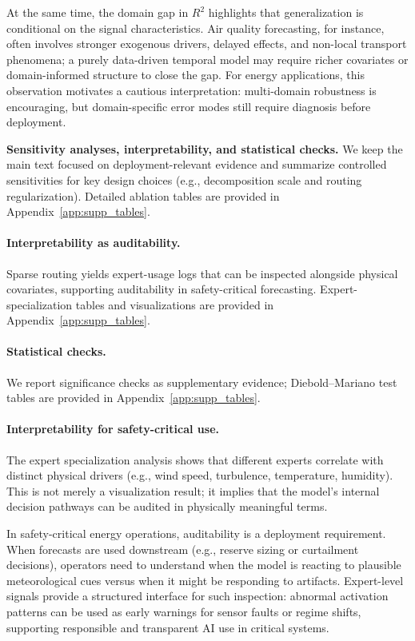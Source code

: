 \documentclass[review,3p,times]{elsarticle}
\begin{document}
At the same time, the domain gap in $R^2$ highlights that generalization is conditional on the signal characteristics. Air quality forecasting, for instance, often involves stronger exogenous drivers, delayed effects, and non-local transport phenomena; a purely data-driven temporal model may require richer covariates or domain-informed structure to close the gap. For energy applications, this observation motivates a cautious interpretation: multi-domain robustness is encouraging, but domain-specific error modes still require diagnosis before deployment.


\noindent\textbf{Sensitivity analyses, interpretability, and statistical checks.}\label{subsec:results_ablation_summary}
We keep the main text focused on deployment-relevant evidence and summarize controlled sensitivities for key design choices (e.g., decomposition scale and routing regularization). Detailed ablation tables are provided in Appendix~\ref{app:supp_tables}.

\paragraph{Interpretability as auditability.}\label{subsec:results_interpret}
Sparse routing yields expert-usage logs that can be inspected alongside physical covariates, supporting auditability in safety-critical forecasting. Expert-specialization tables and visualizations are provided in Appendix~\ref{app:supp_tables}.

\paragraph{Statistical checks.}\label{subsec:results_significance_summary}
We report significance checks as supplementary evidence; Diebold--Mariano test tables are provided in Appendix~\ref{app:supp_tables}.

\paragraph{Interpretability for safety-critical use.}\label{subsec:disc_interpretability}
The expert specialization analysis shows that different experts correlate with distinct physical drivers (e.g., wind speed, turbulence, temperature, humidity). This is not merely a visualization result; it implies that the model's internal decision pathways can be audited in physically meaningful terms.

In safety-critical energy operations, auditability is a deployment requirement. When forecasts are used downstream (e.g., reserve sizing or curtailment decisions), operators need to understand when the model is reacting to plausible meteorological cues versus when it might be responding to artifacts. Expert-level signals provide a structured interface for such inspection: abnormal activation patterns can be used as early warnings for sensor faults or regime shifts, supporting responsible and transparent AI use in critical systems.
\end{document}
